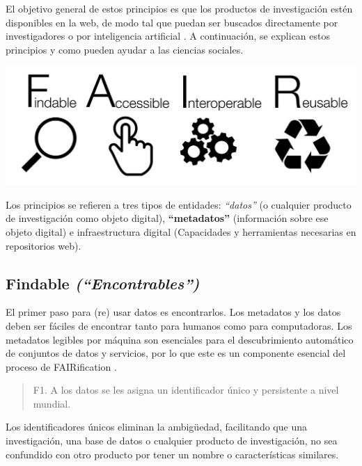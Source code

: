 \documentclass[
  14pt,
]{book}
\let\origfigure\figure
\let\endorigfigure\endfigure
\renewenvironment{figure}[1][2] {
  \expandafter\origfigure\expandafter[H]
} {
  \endorigfigure
}
\begin{document}
El objetivo general de estos principios es que los productos de investigación estén disponibles en la web, de modo tal que puedan ser buscados directamente por investigadores o por inteligencia artificial \citep{gofair_FAIR_2020}. A continuación, se explican estos principios y como pueden ayudar a las ciencias sociales.

\begin{figure}[!ht]

{\centering \includegraphics[width=0.8\linewidth,]{images/FAIR_data_principles} 

}

\end{figure}

Los principios se refieren a tres tipos de entidades: \emph{``datos''} (o cualquier producto de investigación como objeto digital), \textbf{``metadatos''} (información sobre ese objeto digital) e infraestructura digital (Capacidades y herramientas necesarias en repositorios web).

\hypertarget{findable-encontrables}{%
\subsection{\texorpdfstring{\textbf{Findable} \emph{(``Encontrables'')}}{Findable (``Encontrables'')}}\label{findable-encontrables}}

El primer paso para (re) usar datos es encontrarlos. Los metadatos y los datos deben ser fáciles de encontrar tanto para humanos como para computadoras. Los metadatos legibles por máquina son esenciales para el descubrimiento automático de conjuntos de datos y servicios, por lo que este es un componente esencial del proceso de FAIRification .

\begin{quote}
F1. A los datos se les asigna un identificador único y persistente a nivel mundial.
\end{quote}

Los identificadores únicos eliminan la ambigüedad, facilitando que una investigación, una base de datos o cualquier producto de investigación, no sea confundido con otro producto por tener un nombre o características similares.
\end{document}
